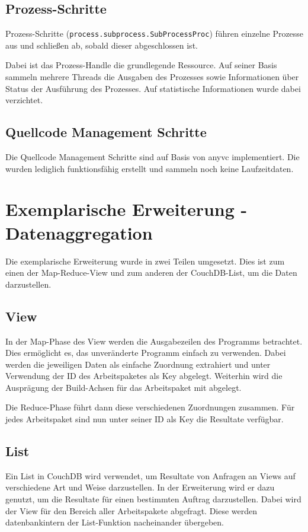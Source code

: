 \subsection{Prozess-Schritte}

Prozess-Schritte (\verb|process.subprocess.SubProcessProc|)
führen einzelne Prozesse aus und schließen ab, sobald dieser
abgeschlossen ist.

Dabei ist das Prozess-Handle die grundlegende Ressource.
Auf seiner Basis sammeln mehrere Threads die Ausgaben des Prozesses sowie Informationen über Status der Ausführung des Prozesses.
Auf statistische Informationen wurde dabei verzichtet.

\subsection{Quellcode Management Schritte}

Die Quellcode Management Schritte sind auf Basis von anyvc \cite{anyvc:website} implementiert. Die wurden lediglich funktionsfähig erstellt und sammeln noch keine Laufzeitdaten.

\section{Exemplarische Erweiterung - Datenaggregation}
\label{sec:imp:extension}

Die exemplarische Erweiterung wurde in zwei Teilen umgesetzt.
Dies ist zum einen der Map-Reduce-View und zum anderen der CouchDB-List, um die Daten darzustellen.

\subsection{View}

In der Map-Phase des View werden die Ausgabezeilen des Programms betrachtet.
Dies ermöglicht es, das unveränderte Programm einfach zu verwenden.
Dabei werden die jeweiligen Daten als einfache Zuordnung extrahiert
und unter Verwendung der ID des Arbeitspaketes als Key abgelegt.
Weiterhin wird die Ausprägung der Build-Achsen für das Arbeitspaket mit abgelegt.

Die Reduce-Phase führt dann diese verschiedenen Zuordnungen zusammen.
Für jedes Arbeitspaket sind nun unter seiner ID als Key die Resultate verfügbar.

\subsection{List}
Ein List in CouchDB wird verwendet, um Resultate von Anfragen an Views auf verschiedene Art und Weise darzustellen. In der Erweiterung wird er dazu genutzt, um die Resultate für einen bestimmten Auftrag darzustellen.
Dabei wird der View für den Bereich aller Arbeitspakete abgefragt.
Diese werden datenbankintern der List-Funktion nacheinander übergeben.

